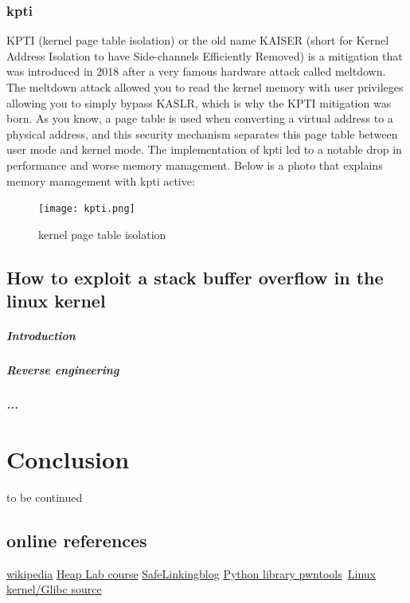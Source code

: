 \documentclass{report}
\begin{document}
    \subsection{kpti}
    KPTI (kernel page table isolation) or the old name KAISER (short for Kernel Address Isolation to have Side-channels Efficiently Removed) is a mitigation that was introduced in 2018 after a very famous hardware attack called meltdown.\newline
    The meltdown attack allowed you to read the kernel memory with user privileges allowing you to simply bypass KASLR, which is why the KPTI mitigation was born.\newline
    As you know, a page table is used when converting a virtual address to a physical address, and this security mechanism separates this page table between user mode and kernel mode.\newline
    The implementation of kpti led to a notable drop in performance and worse memory management.\newline
    Below is a photo that explains memory management with kpti active: \newline
    \begin{figure}[htbp]
        \centering
        \texttt{[image: kpti.png]}
        \caption{kernel page table isolation}
        \label{fig:enter-label}
    \end{figure}
    \clearpage
    \section{How to exploit a stack buffer overflow in the linux kernel}
    \paragraph{Introduction}
    \paragraph{Reverse engineering}
    \paragraph{...}
    \chapter{Conclusion}
    to be continued
    \section{online references}
    \href{https://it.wikipedia.org/wiki/Home_page}{wikipedia}\newline
    \href{https://it.wikipedia.org/wiki/Home_page}{Heap Lab course}\newline
    \href{https://www.researchinnovations.com/post/bypassing-the-upcoming-safe-linking-mitigation}{SafeLinkingblog}\newline 
    \href{https://docs.pwntools.com/en/stable/}{Python library pwntools}\newline\
    \href{https://elixir.bootlin.com/}{Linux kernel/Glibc source}\newline
    \clearpage
\end{document}
